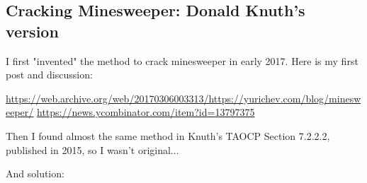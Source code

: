 \subsection{Cracking Minesweeper: Donald Knuth's version}

\renewcommand{\CURPATH}{equations/minesweeper_Knuth}

I first "invented" the method to crack minesweeper in early 2017.
Here is my first post and discussion:

\url{https://web.archive.org/web/20170306003313/https://yurichev.com/blog/minesweeper/}
\url{https://news.ycombinator.com/item?id=13797375}

Then I found almost the same method in Knuth's TAOCP Section 7.2.2.2, published in 2015, so I wasn't original...

\begin{figure}[H]
\centering
{}
\end{figure}

\begin{figure}[H]
\centering
{}
\end{figure}

And solution:

\begin{figure}[H]
\centering
{}
\end{figure}

\begin{figure}[H]
\centering
{}
\end{figure}
